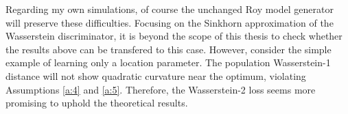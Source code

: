 Regarding my own simulations, of course the unchanged Roy model generator will preserve these difficulties.
Focusing on the Sinkhorn approximation of the Wasserstein discriminator, it is beyond the scope of this thesis to check whether the results above can be transfered to this case.
However, consider the simple example of learning only a location parameter.
The population Wasserstein-1 distance will not show quadratic curvature near the optimum, violating Assumptions \ref{a:4} and \ref{a:5}. %
Therefore, the Wasserstein-2 loss seems more promising to uphold the theoretical results.